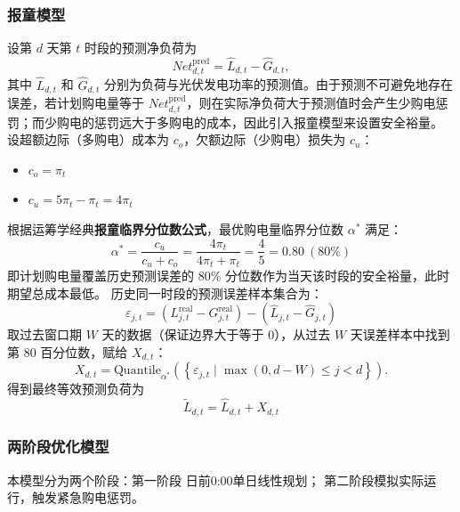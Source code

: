\documentclass{cumcmthesis}
\begin{document}
\subsubsection{报童模型}
设第 $d$ 天第 $t$ 时段的预测净负荷为
\[
Net_{d,t}^{\mathrm{pred}} = \hat{L}_{d,t} - \hat{G}_{d,t},
\]
其中 $\hat{L}_{d,t}$ 和 $\hat{G}_{d,t}$ 分别为负荷与光伏发电功率的预测值。由于预测不可避免地存在误差，若计划购电量等于 $Net_{d,t}^{\mathrm{pred}}$，则在实际净负荷大于预测值时会产生少购电惩罚；而少购电的惩罚远大于多购电的成本，因此引入报童模型来设置安全裕量。\newline\hspace*{2em} 设超额边际（多购电）成本为 $c_o$，欠额边际（少购电）损失为 $c_u$：
\begin{itemize}
    \item $c_o = \pi_t$
    \item $c_u = 5\pi_t - \pi_t = 4\pi_t$
\end{itemize}

根据运筹学经典\textbf{报童临界分位数公式}，最优购电量临界分位数 $\alpha^*$ 满足：
\begin{equation}
\alpha^* = \frac{c_u}{c_u + c_o} = \frac{4\pi_t}{4\pi_t + \pi_t} = \frac{4}{5} = 0.80 \ (80\%)
\end{equation}
即计划购电量覆盖历史预测误差的 80\% 分位数作为当天该时段的安全裕量，此时期望总成本最低\cite{ref1}。
历史同一时段的预测误差样本集合为：
\begin{equation}
\varepsilon_{j,t} = (L_{j,t}^{\text{real}} - G_{j,t}^{\text{real}}) - (\hat{L}_{j,t} - \hat{G}_{j,t})
\end{equation}
取过去窗口期 $W$ 天的数据（保证边界大于等于 0），从过去 $W$ 天误差样本中找到第 80 百分位数，赋给 $X_{d,t}$：
\begin{equation}
X_{d,t} = \mathrm{Quantile}_{\alpha^*}\left(\left\{\varepsilon_{j,t}\mid \max(0,d-W)\le j<d\right\}\right).
\end{equation}
得到最终等效预测负荷为\begin{equation}
\tilde{L}_{d,t} = \hat{L}_{d,t} + X_{d,t}
\end{equation}
\subsubsection{两阶段优化模型}
本模型分为两个阶段：第一阶段
日前0:00单日线性规划；
第二阶段模拟实际运行，触发紧急购电惩罚。
\end{document}
